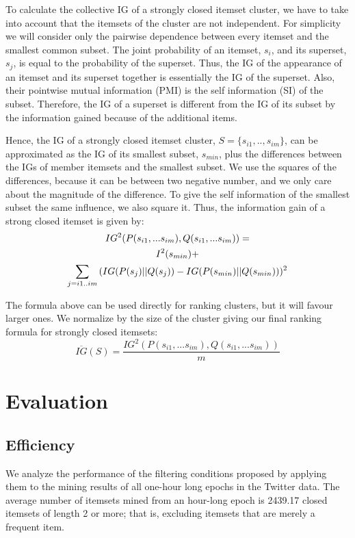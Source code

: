 \documentclass[letterpaper,12pt,titlepage,oneside,final]{book}
\begin{document}
To calculate the collective IG of a strongly closed itemset cluster,
we have to take into account that the itemsets of the cluster are not independent. 
For simplicity we will consider only the pairwise dependence between 
every itemset and the smallest common subset.
The joint probability of an itemset, $s_i$, and its superset,
$s_j$, is equal to the probability of the superset.
Thus, the IG of the appearance of an itemset and its superset
together is essentially the IG of the superset.
Also, their pointwise mutual information (PMI) is the self information (SI) of
the subset. Therefore, the IG of a superset is different from the
IG of its subset by the information gained because
of the additional items. 

Hence, the IG of a strongly closed itemset cluster,
$S=\{s_{i1},..,s_{im}\}$, 
can be approximated as the IG of its smallest subset, $s_{min}$,
plus the differences between the IGs of member itemsets and the smallest subset.
We use the squares of the differences, because it can be between two negative number, and we only care about the magnitude of the difference.
To give the self information of the smallest subset the same influence,
we also square it.
Thus, the information gain of a strong closed itemset is given by:
\begin{multline}IG^2(P(s_{i1},...s_{im}),Q(s_{i1},...s_{im})) =\notag\\ I^2(s_{min}) + \notag\\ 
\sum_{j = i1..im}{(IG(P(s_j)||Q(s_j)) - IG(P(s_{min})||Q(s_{min})))^{2}} \end{multline}

The formula above can be used directly for ranking clusters,
but it will favour larger ones.
We normalize by the size of the cluster giving our final ranking formula for
strongly closed itemsets:
\begin{equation}\label{eq:avgIG}\overline{IG}(S) = \frac{IG^2(P(s_{i1},...s_{im}),Q(s_{i1},...s_{im}))}{m}\end{equation}


\chapter{Evaluation}
\label{sec:empirical}


\section{Efficiency}
\label{sec:bounding}
We analyze the performance of the filtering conditions proposed by applying
them to the mining results of all one-hour long epochs in the Twitter data.
The average number of itemsets mined from an hour-long epoch is
2439.17 closed itemsets of length 2 or more;
that is, excluding itemsets that are merely a frequent item.
\end{document}
